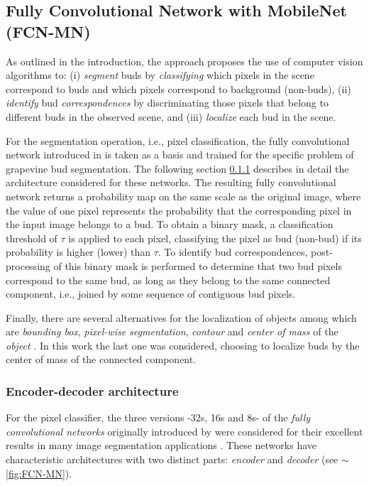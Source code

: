 \documentclass[a4paper,authoryear,review]{elsarticle}
\begin{document}
\subsection{Fully Convolutional Network with MobileNet (FCN-MN)}
\label{sec:fcn}

As outlined in the introduction, the approach proposes the use of computer vision algorithms to: (i) \emph{segment} buds by \emph{classifying} which pixels in the scene correspond to buds and which pixels correspond to background (non-buds), (ii) \emph{identify} bud \emph{correspondences} by discriminating those pixels that belong to different buds in the observed scene, and (iii) \emph{localize} each bud in the scene. 

For the segmentation operation, i.e., pixel classification, the fully convolutional network introduced in \citep{long2015fully} is taken as a basis and trained for the specific problem of grapevine bud segmentation. The following section  \ref{sec:fcnmn} describes in detail the architecture considered for these networks. The resulting fully convolutional network returns a probability map on the same scale as the original image, where the value of one pixel represents the probability that the corresponding pixel in the input image belongs to a bud. To obtain a binary mask, a classification threshold of $\tau$ is applied to each pixel, classifying the pixel as bud (non-bud) if its probability is higher (lower) than $\tau$. To identify bud correspondences, post-processing of this binary mask is performed to determine that two bud pixels correspond to the same bud, as long as they belong to the same connected component, i.e., joined by some sequence of contiguous bud pixels. 

Finally, there are several alternatives for the localization of objects among which are \emph{bounding box}, \emph{pixel-wise segmentation}, \emph{contour} and \emph{center of mass} of the \emph{object} \citep{lampert2008beyond}. In this work the last one was considered, choosing to localize buds by the center of mass of the connected component. 

\subsubsection {Encoder-decoder architecture}
\label{sec:fcnmn}

For the pixel classifier, the three versions -32s, 16s and 8s-  of the \emph{fully convolutional networks} originally introduced by \citet{long2015fully} were considered for their excellent results in many image segmentation applications \citep{litjens2017survey, garcia2018survey, kaymak2019brief}. These networks have characteristic architectures with two distinct parts: \emph{encoder} and \emph{decoder} (see $\sim$\ref{fig:FCN-MN}). 
\end{document}
